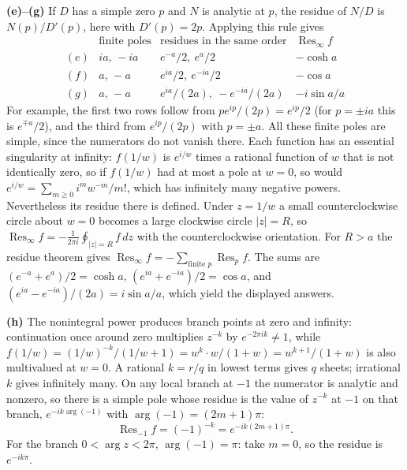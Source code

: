 \textbf{(e)--(g)} If $D$ has a simple zero $p$ and $N$ is analytic at
$p$, the residue of $N/D$ is $N(p)/D'(p)$, here with $D'(p)=2p$.
Applying this rule gives
\[
\begin{array}{c|c|c|c}
&\text{finite poles}&\text{residues in the same order}
&\operatorname{Res}_{\infty}f\\ \hline
(e)&ia,\,-ia&e^{-a}/2,\ e^{a}/2&-\cosh a\\
(f)&a,\,-a&e^{ia}/2,\ e^{-ia}/2&-\cos a\\
(g)&a,\,-a&e^{ia}/(2a),\ -e^{-ia}/(2a)&-i\sin a/a
\end{array}
\]
For example, the first two rows follow from
$p e^{ip}/(2p)=e^{ip}/2$ (for $p=\pm ia$ this is $e^{\mp a}/2$), and
the third from $e^{ip}/(2p)$ with $p=\pm a$.
All these finite poles are simple, since the numerators do not vanish
there. Each function has an essential singularity at infinity:
$f(1/w)$ is $e^{i/w}$ times a rational function of $w$ that is not
identically zero, so if $f(1/w)$ had at most a pole at $w=0$, so would
$e^{i/w}=\sum_{m\ge0}i^mw^{-m}/m!$, which has infinitely many negative
powers. Nevertheless its residue there is defined. Under $z=1/w$ a
small counterclockwise circle about $w=0$ becomes a large clockwise
circle $|z|=R$, so
$\operatorname{Res}_\infty f=-\frac1{2\pi i}\oint_{|z|=R}f\,dz$ with
the counterclockwise orientation. For $R>a$ the residue theorem gives
$\operatorname{Res}_{\infty}f=-\sum_{\text{finite }p}\operatorname{Res}_p f$.
The sums are $(e^{-a}+e^a)/2=\cosh a$, $(e^{ia}+e^{-ia})/2=\cos a$, and
$(e^{ia}-e^{-ia})/(2a)=i\sin a/a$, which yield the displayed answers.

\textbf{(h)} The nonintegral power produces branch points at zero and
infinity: continuation once around zero multiplies $z^{-k}$ by
$e^{-2\pi i k}\ne1$, while
$f(1/w)=(1/w)^{-k}/(1/w+1)=w^{k}\cdot w/(1+w)=w^{k+1}/(1+w)$
is also multivalued at $w=0$. A rational $k=r/q$ in lowest terms gives
$q$ sheets; irrational $k$ gives infinitely many. On any local branch
at $-1$ the numerator is analytic and nonzero, so there is a simple
pole whose residue is the value of $z^{-k}$ at $-1$ on that branch,
$e^{-ik\arg(-1)}$ with $\arg(-1)=(2m+1)\pi$:
\[
\boxed{\operatorname{Res}_{-1}f=(-1)^{-k}
=e^{-ik(2m+1)\pi}}.
\]
For the branch $0<\arg z<2\pi$, $\arg(-1)=\pi$: take $m=0$, so the
residue is $e^{-ik\pi}$.


